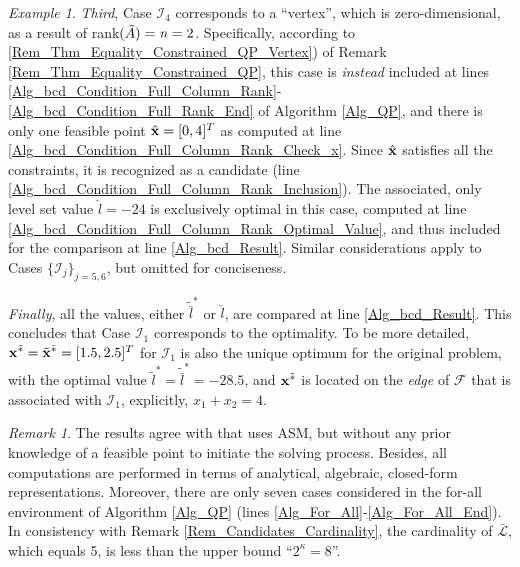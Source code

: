 \documentclass[9pt,twocolumn,twoside,lineno]{pnas-new-1}
\newcommand{\bfx}{{\bf x}}
\newcommand{\calF}{{\mathcal F}}
\newcommand{\calI}{{\mathcal I}}
\newcommand{\calL}{{\mathcal L}}
\newcommand{\itn}{{\it n}}
\theoremstyle{remark}
\newtheorem{remark}{Remark}[section]
\newtheorem{example}{Example}[section]
\begin{document}
\begin{example}
\textit{Third}, Case $\calI_4$ corresponds to a ``vertex'', which is zero-dimensional, as a result of rank$(\tilde A)=\itn=2$. Specifically, according to \ref{Rem_Thm_Equality_Constrained_QP_Vertex}) of Remark \ref{Rem_Thm_Equality_Constrained_QP}, this case is \textit{instead} included at lines \ref{Alg_bcd_Condition_Full_Column_Rank}-\ref{Alg_bcd_Condition_Full_Rank_End} of Algorithm \ref{Alg_QP}, and there is only one feasible point $\hat\bfx=[0,4]^T$ as computed at line \ref{Alg_bcd_Condition_Full_Column_Rank_Check_x}. Since $\hat\bfx$ satisfies all the constraints, it is recognized as a candidate (line \ref{Alg_bcd_Condition_Full_Column_Rank_Inclusion}). The associated, only level set value $\hat l=-24$ is exclusively optimal in this case, computed at line \ref{Alg_bcd_Condition_Full_Column_Rank_Optimal_Value}, and thus included for the comparison at line \ref{Alg_bcd_Result}. Similar considerations apply to Cases $\{\calI_j\}_{j=5,6}$, but omitted for conciseness.

\textit{Finally}, all the values, either $\tilde{\bar l}^*$ or $\hat l$, are compared at line \ref{Alg_bcd_Result}. This concludes that Case $\calI_1$ corresponds to the optimality. To be more detailed, $\bfx^{\tilde *}=\tilde\bfx^{\bar *}=[1.5,2.5]^T$ for $\calI_1$ is also the unique optimum for the original problem, with the optimal value $\tilde l^*=\tilde{\bar l}^*=-28.5$, and $\bfx^{\tilde *}$ is located on the \textit{edge} of $\calF$ that is associated with $\calI_1$, explicitly, $x_1+x_2=4$.

\begin{remark}
The results agree with \cite{Lu(Ye):03(16)} that uses ASM, but without any prior knowledge of a feasible point to initiate the solving process. Besides, all computations are performed in terms of analytical, algebraic, closed-form representations. Moreover, there are only seven cases considered in the for-all environment of Algorithm \ref{Alg_QP} (lines \ref{Alg_For_All}-\ref{Alg_For_All_End}). In consistency with Remark \ref{Rem_Candidates_Cardinality}, the cardinality of $\bar\calL$, which equals 5, is less than the upper bound ``$2^\kappa=8$''.
\label{Rem_Ex_QP_Nonsingular}
\end{remark}

\label{Ex_QP_Nonsingular}
\end{example}
\end{document}
